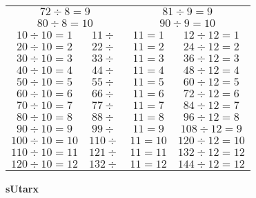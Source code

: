 \begin{longtable}{|c|c@{}c|c|}
\multicolumn{2}{|c|}{$72\div8=9$} &\multicolumn{2}{c|}{$81\div9=9$}\\
\multicolumn{2}{|c|}{$80\div8=10$} &\multicolumn{2}{c|}{$90\div9=10$}\\
\hline
$10\div10=1$& $11\div$&$11=1$ & $12\div12=1$\\
$20\div10=2$& $22\div$&$11=2$ & $24\div12=2$\\
$30\div10=3$& $33\div$&$11=3$ & $36\div12=3$\\
$40\div10=4$&  $44\div$&$11=4$ & $48\div12=4$\\
$50\div10=5$&  $55\div$&$11=5$ & $60\div12=5$\\
$60\div10=6$&$66\div$&$11=6$ & $72\div12=6$\\
$70\div10=7$& $77\div$&$11=7$ & $84\div12=7$\\
$80\div10=8$& $88\div$&$11=8$ & $96\div12=8$\\
$90\div10=9$& $99\div$&$11=9$ & $108\div12=9$\\
$100\div10=10$& $110\div$&$11=10$ & $120\div12=10$\\
$110\div10=11$& $121\div$&$11=11$ & $132\div12=12$\\
$120\div10=12$& $132\div$&$11=12$ & $144\div12=12$\\
\hline
\end{longtable}



\begin{center}
{\large\bf sUtarx}
\end{center}

